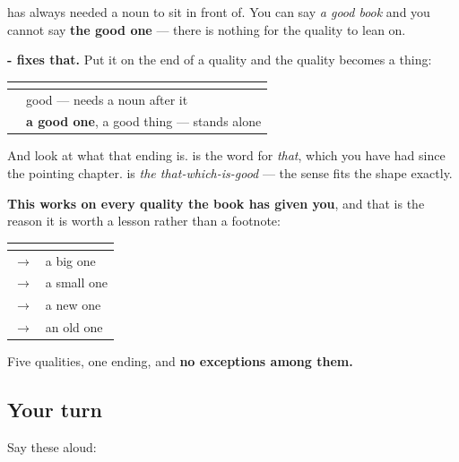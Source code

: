 \begin{grammarlens}[title={Grammar Lens: a quality with nothing to lean on}]
\textbf{} has always needed a noun to sit in front of. You can say \emph{a good book} and you cannot say \textbf{the good one} — there is nothing for the quality to lean on.

\textbf{- fixes that.} Put it on the end of a quality and the quality becomes a thing:

\noindent
\begin{tabularx}{\linewidth}{@{}>{\raggedright\arraybackslash}X>{\raggedright\arraybackslash}X@{}}
\toprule
\textbf{} & \textbf{} \\
\midrule
\textbf{\ml{നല്ല}} & good — needs a noun after it \\
\textbf{\ml{നല്ലത്}} & \textbf{a good one}, a good thing — stands alone \\
\bottomrule
\end{tabularx}

And look at what that ending is. \textbf{} is the word for \emph{that}, which you have had since the pointing chapter. \textbf{} is \emph{the that-which-is-good} — the sense fits the shape exactly.

\textbf{This works on every quality the book has given you}, and that is the reason it is worth a lesson rather than a footnote:

\noindent
\begin{tabularx}{\linewidth}{@{}>{\raggedright\arraybackslash}X>{\raggedright\arraybackslash}X@{}}
\toprule
\textbf{} & \textbf{} \\
\midrule
\textbf{\ml{വലിയ}} $\to$ \textbf{\ml{വലിയത്}} & a big one \\
\textbf{\ml{ചെറിയ}} $\to$ \textbf{\ml{ചെറിയത്}} & a small one \\
\textbf{\ml{പുതിയ}} $\to$ \textbf{\ml{പുതിയത്}} & a new one \\
\textbf{\ml{പഴയ}} $\to$ \textbf{\ml{പഴയത്}} & an old one \\
\bottomrule
\end{tabularx}

Five qualities, one ending, and \textbf{no exceptions among them.}
\end{grammarlens}

\subsection*{Your turn}
Say these aloud:

